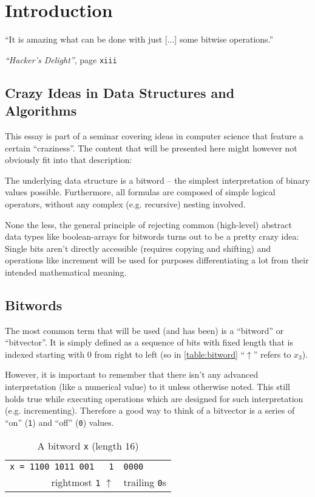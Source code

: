 \section{Introduction}\label{sec:introduction}
\epigraph{
``It is amazing what can be done
with just [...] some bitwise operations.''
}{
\emph{``Hacker's Delight''}, page \texttt{xiii}
\cite{Warren:2012:HD:2462741}
}


\subsection*{Crazy Ideas in Data Structures and Algorithms}
This essay is part of a seminar covering
ideas in computer science that feature a certain ``craziness''.
The content that will be presented here
might however not obviously fit into that description:

The underlying data structure is a bitword
-- the simplest interpretation of binary values possible.
Furthermore, all formulas are composed of simple logical operators,
without any complex (e.g. recursive) nesting involved.

None the less, the general principle of rejecting
common (high-level) abstract data types like boolean-arrays
for bitwords turns out to be a pretty crazy idea:
Single bits aren't directly accessible (requires copying and shifting)
and operations like increment will be used for
purposes differentiating a lot from their intended mathematical meaning.


\subsection*{Bitwords}
The most common term that will be used (and has been)
is a ``bitword'' or ``bitvector''.
It is simply defined as a sequence of bits with fixed length
that is indexed starting with $0$ from right to left
(so in \autoref{table:bitword} ``$\uparrow$'' refers to $x_3$).

However, it is important to remember that
there isn't any advanced interpretation (like a numerical value) to it
unless otherwise noted.
This still holds true while executing operations
which are designed for such interpretation (e.g. incrementing).
Therefore a good way to think of a bitvector
is a series of ``on'' (\lstinline$1$) and ``off'' (\lstinline$0$) values.

\begin{table}[h]
\begin{tabular}{rcl}
\lstinline$x = 1100 1011 001 $ & \lstinline$1$ & \lstinline$0000$\\
\multicolumn{2}{r}{rightmost \lstinline$1$ $\uparrow$}
& trailing \lstinline$0$s\\
\end{tabular}
\caption{A bitword \lstinline$x$ (length $16$)}
\label{table:bitword}
\end{table}

